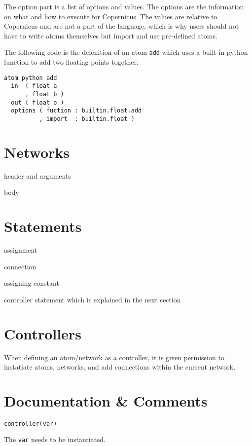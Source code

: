 The option part is a list of options and values. The options are the
information on what and how to execute for Copernicus. The values are
relative to Copernicus and are not a part of the language, which is
why users should not have to write atoms themselves but import and use
pre-defined atoms.

The following code is the defenition of an atom \verb#add# which uses
a built-in python function to add two floating points together.

\begin{verbatim}
atom python add
  in  ( float a
      , float b )
  out ( float o )
  options ( fuction : builtin.float.add
          , import  : builtin.float )
\end{verbatim}

\section{Networks}\label{sec:net}
header and arguments

body

\section{Statements} \label{sec:stmt}
assignment

connection

assigning constant

controller statement which is explained in the next section

\section{Controllers}
When defining an atom/network as a controller, it is given permission
to instatiate atoms, networks, and add connections within the current
network.


\section{Documentation \& Comments}

\begin{verbatim}
controller(var)
\end{verbatim}

The \verb#var# needs to be instantiated.
